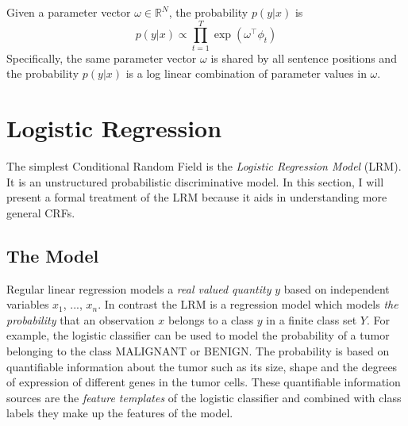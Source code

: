 Given a parameter vector $\omega \in \mathbb{R}^N$, the probability $p(y|x)$ is
$$p(y|x) \propto \prod_{t = 1}^T \exp(\omega^\top \phi_t)$$
Specifically, the same parameter vector $\omega$ is shared by all
sentence positions and the probability $p(y|x)$ is a log linear
combination of parameter values in $\omega$.

\cite{Lafferty2001}
\section{Logistic Regression}

The simplest Conditional Random Field is the {\it Logistic Regression
  Model} (LRM). It is an unstructured probabilistic discriminative
model. In this section, I will present a formal treatment of the
LRM because it aids in understanding more general
CRFs.

\subsection{The Model}
\label{sec:lr-model}

Regular linear regression models a {\it real valued quantity} $y$
based on independent variables $x_1$, ..., $x_n$. In contrast the LRM
is a regression model which models {\it the probability} that an
observation $x$ belongs to a class $y$ in a finite class set $Y$. For
example, the logistic classifier can be used to model the probability
of a tumor belonging to the class {\sc MALIGNANT} or BENIGN. The
probability is based on quantifiable information about the tumor such
as its size, shape and the degrees of expression of different genes in
the tumor cells. These quantifiable information sources are the {\it
  feature templates} of the logistic classifier and combined with
class labels they make up the features of the
model. %


